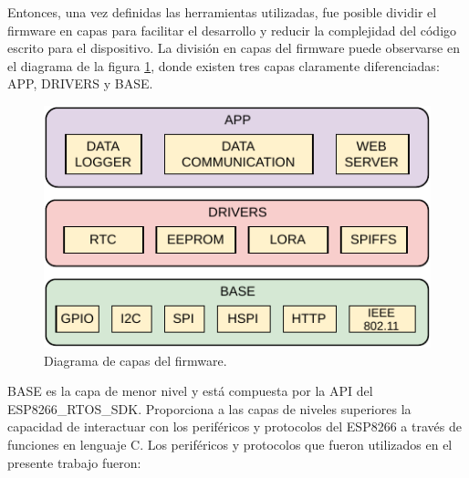 Entonces, una vez definidas las herramientas utilizadas, fue posible dividir el firmware en capas para facilitar el desarrollo y reducir la complejidad del código escrito para el dispositivo. La división en capas del firmware puede observarse en el diagrama de la figura \ref{fig:firmwareLayers}, donde existen tres capas claramente diferenciadas: APP, DRIVERS y BASE.

\begin{figure}[h]
	\centering
	\includegraphics[scale=1]{./Figures/firmware_layers.pdf}
	\caption{Diagrama de capas del firmware.}
		\label{fig:firmwareLayers}
\end{figure}

BASE es la capa de menor nivel y está compuesta por la API del ESP8266\_RTOS\_SDK. Proporciona a las capas de niveles superiores la capacidad de interactuar con los periféricos y protocolos del ESP8266 a través de funciones en lenguaje C. Los periféricos y protocolos que fueron utilizados en el presente trabajo fueron:

